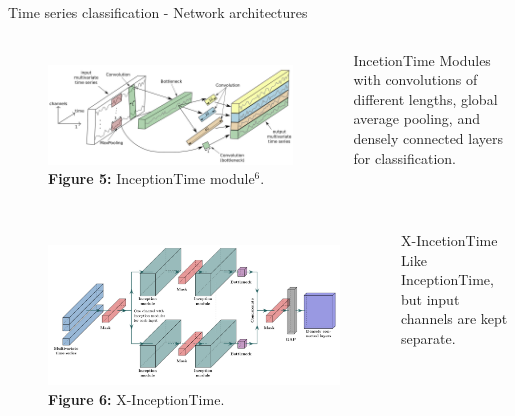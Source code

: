 \begin{frame}[fragile]{Time series classification - Network architectures}
  \begin{columns}[c,onlytextwidth]
    \begin{figure}
      \centering
      \includegraphics[width=\textwidth]{files/figs/tsc/inception-time-module.png}
      {\scriptsize\textbf{Figure 5:} InceptionTime module$^6$.}
    \end{figure}

  \begin{block}{IncetionTime\footnotemark}
    Modules with convolutions of different lengths, global average pooling, and densely connected layers for classification.
  \end{block}
  \end{columns}

  \begin{columns}[c,onlytextwidth]
    \begin{figure}
      \centering
      \includegraphics[width=\textwidth]{files/figs/met/x-inception-w-masks.pdf}
      {\scriptsize\textbf{Figure 6:} X-InceptionTime.}
    \end{figure}

  \begin{block}{X-IncetionTime}
    Like InceptionTime, but input channels are kept separate.
  \end{block}
  \end{columns}

\end{frame}

